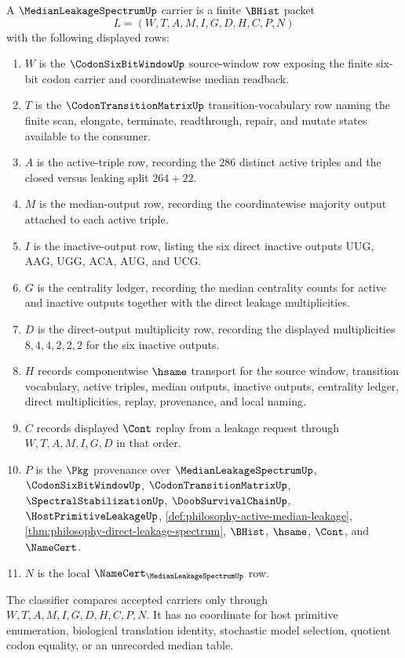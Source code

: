 \begin{definition}\label{def:median-leakage-spectrum-carrier}
A $\MedianLeakageSpectrumUp$ carrier is a finite $\BHist$ packet
$$
L=(W,T,A,M,I,G,D,H,C,P,N)
$$
with the following displayed rows:
\begin{enumerate}
\item $W$ is the $\CodonSixBitWindowUp$ source-window row exposing the finite six-bit codon carrier and coordinatewise median readback.
\item $T$ is the $\CodonTransitionMatrixUp$ transition-vocabulary row naming the finite scan, elongate, terminate, readthrough, repair, and mutate states available to the consumer.
\item $A$ is the active-triple row, recording the $286$ distinct active triples and the closed versus leaking split $264+22$.
\item $M$ is the median-output row, recording the coordinatewise majority output attached to each active triple.
\item $I$ is the inactive-output row, listing the six direct inactive outputs $\mathrm{UUG}$, $\mathrm{AAG}$, $\mathrm{UGG}$, $\mathrm{ACA}$, $\mathrm{AUG}$, and $\mathrm{UCG}$.
\item $G$ is the centrality ledger, recording the median centrality counts for active and inactive outputs together with the direct leakage multiplicities.
\item $D$ is the direct-output multiplicity row, recording the displayed multiplicities $8,4,4,2,2,2$ for the six inactive outputs.
\item $H$ records componentwise $\hsame$ transport for the source window, transition vocabulary, active triples, median outputs, inactive outputs, centrality ledger, direct multiplicities, replay, provenance, and local naming.
\item $C$ records displayed $\Cont$ replay from a leakage request through $W,T,A,M,I,G,D$ in that order.
\item $P$ is the $\Pkg$ provenance over $\MedianLeakageSpectrumUp$, $\CodonSixBitWindowUp$, $\CodonTransitionMatrixUp$, $\SpectralStabilizationUp$, $\DoobSurvivalChainUp$, $\HostPrimitiveLeakageUp$, \autoref{def:philosophy-active-median-leakage}, \autoref{thm:philosophy-direct-leakage-spectrum}, $\BHist$, $\hsame$, $\Cont$, and $\NameCert$.
\item $N$ is the local $\NameCert_{\MedianLeakageSpectrumUp}$ row.
\end{enumerate}
The classifier compares accepted carriers only through $W,T,A,M,I,G,D,H,C,P,N$. It has no coordinate for host primitive enumeration, biological translation identity, stochastic model selection, quotient codon equality, or an unrecorded median table.
\end{definition}


